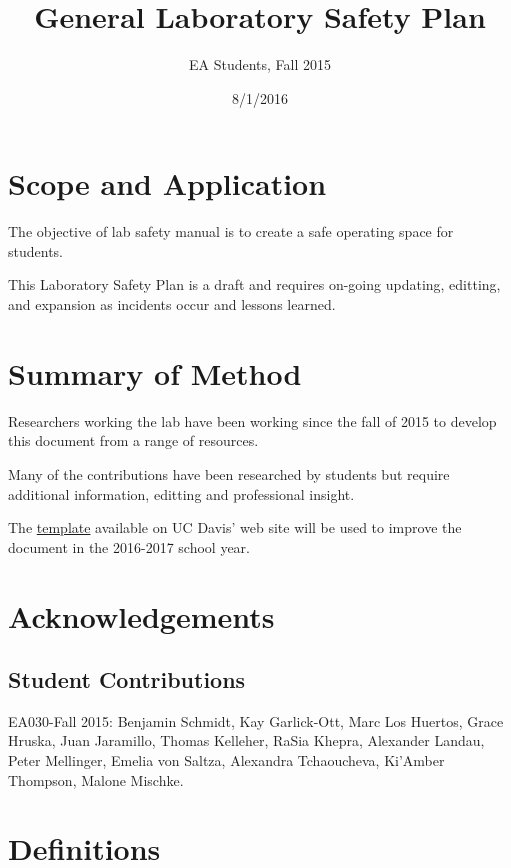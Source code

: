 \documentclass[12pt]{../SOP2}
\title{General Laboratory Safety Plan}
\date{8/1/2016}
\author{EA Students, Fall 2015}
\begin{document}


\maketitle



\section{Scope and Application}

\NP The objective of lab safety manual is to create a safe operating space for students.

\NP This Laboratory Safety Plan is a draft and requires on-going updating, editting, and expansion as incidents occur and lessons learned. 


\section{Summary of Method}

\NP Researchers working the lab have been working since the fall of 2015 to develop this document from a range of resources. 

\NP Many of the contributions have been researched by students but require additional information, editting and professional insight.

\NP The \href{http://safetyservices.ucdavis.edu/sites/default/files/documents/LabSafetyPlan_Template.docx}{template} available on UC Davis' web site will be used to improve the document in the 2016-2017 school year.

\tableofcontents

\section{Acknowledgements}

\subsection*{Student Contributions}

\NP EA030-Fall 2015: Benjamin Schmidt, Kay Garlick-Ott, Marc Los Huertos, Grace Hruska, Juan Jaramillo, Thomas Kelleher, RaSia Khepra, Alexander Landau, Peter Mellinger, Emelia von Saltza, Alexandra Tchaoucheva, Ki'Amber Thompson, Malone Mischke.



\section{Definitions}
\end{document}
